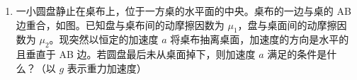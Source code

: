\documentclass[\gkver]{gaokaozhenti}
\begin{document}
\begin{enumerate}
{	\[ E=B(l_{2}-l_{1})v \tag{①} \]

	回路中的感应电流为

	\[ I=\frac{E}{R} \tag{②} \]

	电流沿顺时针方向。两金属杆都要受到安培力作用，作用于杆 $x_{1}y_{1}$ 的安培力为

	\[ F_{1}=BIl_{1} \tag{③} \]

	方向向上，作用于杆 $x_{2}y_{2}$ 的安培力为

	\[ F_{2}=BIl_{2} \tag{④} \]

	方向向下。当杆做匀速运动时，对系统受力分析得

	\[ F-m_{1}g-m_{2}g+F_{1}-F_{2}=0 \tag{⑤} \]

	联立解得

	\[ I=\frac{F-(m_{1}+m_{2})g}{B(l_{2}-l_{1})} \tag{⑥} \]

	\[ v=\frac{F-(m_{1}+m_{2})g}{B^{2}(l_{2}-l_{1})^{2}}R \tag{⑦} \]

	作用于两杆的重力的功率的大小

	\[ P=(m_{1}+m_{2})gv \tag{⑧} \]

	回路电阻上的热功率为

	\[ Q=I^{2}R \tag{⑨} \]

	由⑥⑦⑧⑨式，可得

	\[ P=\frac{F-(m_{1}+m_{2})g}{B^{2}(l_{2}-l_{1})^{2}}R(m_{1}+m_{2})g, \]

	\[ Q=\left[\frac{F-(m_{1}+m_{2})g}{B(l_{2}-l_{1})}\right]^{2}R. \]
}

\item
一小圆盘静止在桌布上，位于一方桌的水平面的中央。桌布的一边与桌的 AB 边重合，如图。已知盘与桌布间的动摩擦因数为 $\mu_{1}$，盘与桌面间的动摩擦因数为 $\mu_{2}$。现突然以恒定的加速度 $a$ 将桌布抽离桌面，加速度的方向是水平的且垂直于 AB 边。若圆盘最后未从桌面掉下，则加速度 $a$ 满足的条件是什么？（以 $g$ 表示重力加速度）
\onepicture[align=right, w=5.61cm]{}
\end{enumerate}
\end{document}
